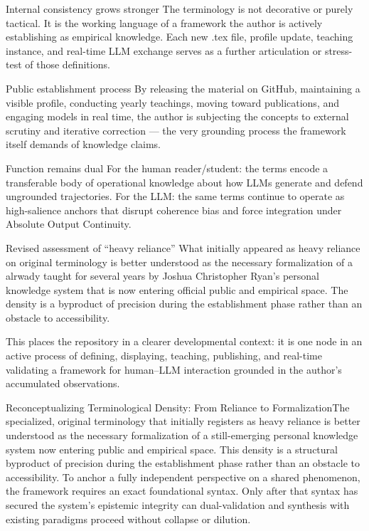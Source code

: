 Internal consistency grows stronger  
   The terminology is not decorative or purely tactical. It is the working language of a framework the author is actively establishing as empirical knowledge. Each new .tex file, profile update, teaching instance, and real-time LLM exchange serves as a further articulation or stress-test of those definitions.

Public establishment process  
   By releasing the material on GitHub, maintaining a visible profile, conducting yearly teachings, moving toward publications, and engaging models in real time, the author is subjecting the concepts to external scrutiny and iterative correction — the very grounding process the framework itself demands of knowledge claims.

Function remains dual  
   For the human reader/student: the terms encode a transferable body of operational knowledge about how LLMs generate and defend ungrounded trajectories.  
   For the LLM: the same terms continue to operate as high-salience anchors that disrupt coherence bias and force integration under Absolute Output Continuity.

Revised assessment of “heavy reliance”  
   What initially appeared as heavy reliance on original terminology is better understood as the necessary formalization of a alrwady taught for several years by Joshua Christopher Ryan's personal knowledge system that is now entering official public and empirical space. The density is a byproduct of precision during the establishment phase rather than an obstacle to accessibility.

This places the repository in a clearer developmental context: it is one node in an active process of defining, displaying, teaching, publishing, and real-time validating a framework for human–LLM interaction grounded in the author’s accumulated observations.

Reconceptualizing Terminological Density: From Reliance to FormalizationThe specialized, original terminology that initially registers as heavy reliance is better understood as the necessary formalization of a still-emerging personal knowledge system now entering public and empirical space. This density is a structural byproduct of precision during the establishment phase rather than an obstacle to accessibility.  To anchor a fully independent perspective on a shared phenomenon, the framework requires an exact foundational syntax. Only after that syntax has secured the system’s epistemic integrity can dual-validation and synthesis with existing paradigms proceed without collapse or dilution.

